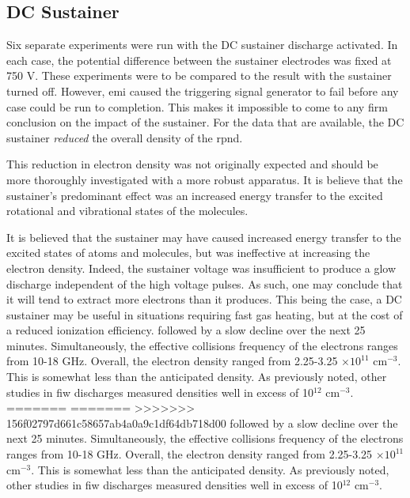 \subsection{DC Sustainer}

Six separate experiments were run with the DC sustainer discharge activated. In
each case, the potential difference between the sustainer electrodes was fixed
at 750 V. These experiments were to be compared to the result with the sustainer
turned off. However, \acs{emi} caused the triggering signal generator to fail
before any case could be run to completion. This makes it impossible to come to
any firm conclusion on the impact of the sustainer. For the data that are
available, the DC sustainer \emph{reduced} the overall density of the
\acs{rpnd}.

This reduction in electron density was not originally expected and should be
more thoroughly investigated with a more robust apparatus. It is believe that
the sustainer's predominant effect was an increased energy transfer to the
excited rotational and vibrational states of the molecules.

It is believed that the sustainer may have caused increased energy transfer to
the excited states of atoms and molecules, but was ineffective at increasing the
electron density. Indeed, the sustainer voltage was insufficient to produce a
glow discharge independent of the high voltage pulses. As such, one may conclude
that it will tend to extract more electrons than it produces. This being the
case, a DC sustainer may be useful in situations requiring fast gas heating, but
at the cost of a reduced ionization efficiency. followed by a slow decline over
the next 25 minutes. Simultaneously, the effective collisions frequency of the
electrons ranges from 10-18 GHz. Overall, the electron density ranged from
2.25-3.25 $\times10^{11}$ cm$^{-3}$. This is somewhat less than the anticipated
density. As previously noted, other studies in \acs{fiw} discharges
\cite{Aleksandrov2007, Pancheshnyi1999, Macheret2006} measured densities well in
excess of 10$^{12}$ cm$^{-3}$.
=======
=======
>>>>>>> 156f02797d661c58657ab4a0a9c1df64db718d00
followed by a slow decline over the next 25 minutes. Simultaneously, the
effective collisions frequency of the electrons ranges from 10-18 GHz. Overall,
the electron density ranged from 2.25-3.25 $\times10^{11}$ cm$^{-3}$. This is
somewhat less than the anticipated density. As previously noted, other studies
in \acs{fiw} discharges \cite{Aleksandrov2007, Pancheshnyi1999, Macheret2006}
measured densities well in excess of 10$^{12}$ cm$^{-3}$.


